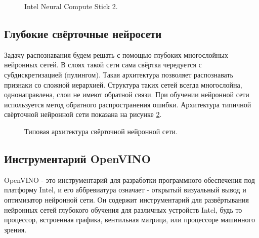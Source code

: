 \documentclass[14pt,a4paper]{scrartcl}
\begin{document}
		\begin{figure}[h]
			\caption{Intel Neural Compute Stick 2.}
			\label{fig:NCS1}
		\end{figure}
	
		
	
	\subsection{Глубокие свёрточные нейросети}
	
		Задачу распознавания будем решать с помощью глубоких многослойных нейронных сетей. В слоях такой сети сама свёртка чередуется с субдискретизацией (пулингом). Такая архитектура позволяет распознавать признаки со сложной иерархией. Структура таких сетей всегда многослойна, однонаправлена, слои не имеют обратной связи. При обучении нейронной сети используется метод обратного распространения ошибки. Архитектура типичной свёрточной нейронной сети показана на рисунке \ref{fig:Typical_CNN}\cite{bib:Deep_Conv_Network_Wiki}.
	
		
		\begin{figure}[h]
			\caption{Типовая архитектура свёрточной нейронной сети.}
			\label{fig:Typical_CNN}
		\end{figure}
		
	
	\subsection{Инструментарий OpenVINO}
	
		OpenVINO - это инструментарий для разработки программного обеспечения под платформу Intel, и его аббревиатура означает - открытый визуальный вывод и оптимизатор нейронной сети. Он содержит инструментарий для развёртывания нейронных сетей глубокого обучения для различных устройств Intel, будь то процессор, встроенная графика, вентильная матрица, или процессоре машинного зрения\cite{bib:OpenVINO_Product_Page}.
	
\end{document}
